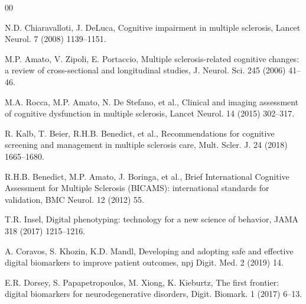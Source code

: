 \documentclass[preprint,12pt,a4paper]{elsarticle}
\begin{document}
\begin{thebibliography}{00}

 N.D. Chiaravalloti, J. DeLuca, Cognitive impairment in multiple sclerosis, Lancet Neurol. 7 (2008) 1139--1151.

 M.P. Amato, V. Zipoli, E. Portaccio, Multiple sclerosis-related cognitive changes: a review of cross-sectional and longitudinal studies, J. Neurol. Sci. 245 (2006) 41--46.

 M.A. Rocca, M.P. Amato, N. De Stefano, et al., Clinical and imaging assessment of cognitive dysfunction in multiple sclerosis, Lancet Neurol. 14 (2015) 302--317.

 R. Kalb, T. Beier, R.H.B. Benedict, et al., Recommendations for cognitive screening and management in multiple sclerosis care, Mult. Scler. J. 24 (2018) 1665--1680.

 R.H.B. Benedict, M.P. Amato, J. Boringa, et al., Brief International Cognitive Assessment for Multiple Sclerosis (BICAMS): international standards for validation, BMC Neurol. 12 (2012) 55.

 T.R. Insel, Digital phenotyping: technology for a new science of behavior, JAMA 318 (2017) 1215--1216.

 A. Coravos, S. Khozin, K.D. Mandl, Developing and adopting safe and effective digital biomarkers to improve patient outcomes, npj Digit. Med. 2 (2019) 14.

 E.R. Dorsey, S. Papapetropoulos, M. Xiong, K. Kieburtz, The first frontier: digital biomarkers for neurodegenerative disorders, Digit. Biomark. 1 (2017) 6--13.

\end{thebibliography}
\end{document}
